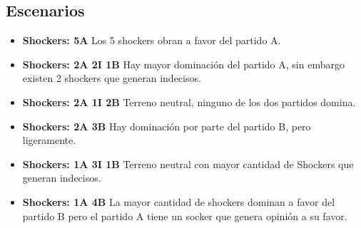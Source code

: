 \subsection{Escenarios} %
\label{sub:Escenarios}

\begin{itemize}
    \item \textbf{Shockers: 5A} Los 5 shockers obran a favor del partido A.
    \item \textbf{Shockers: 2A 2I 1B} Hay mayor dominación del partido A, sin embargo existen 2 shockers que generan indecisos.
    \item \textbf{Shockers: 2A 1I 2B} Terreno neutral, ninguno de los dos partidos domina.
    \item \textbf{Shockers: 2A 3B} Hay dominación por parte del partido B, pero ligeramente.
    \item \textbf{Shockers: 1A 3I 1B} Terreno neutral con mayor cantidad de Shockers que generan indecisos.
    \item \textbf{Shockers: 1A 4B} La mayor cantidad de shockers dominan a favor del partido B pero el partido A tiene un socker que genera opinión a su favor.  
\end{itemize}

